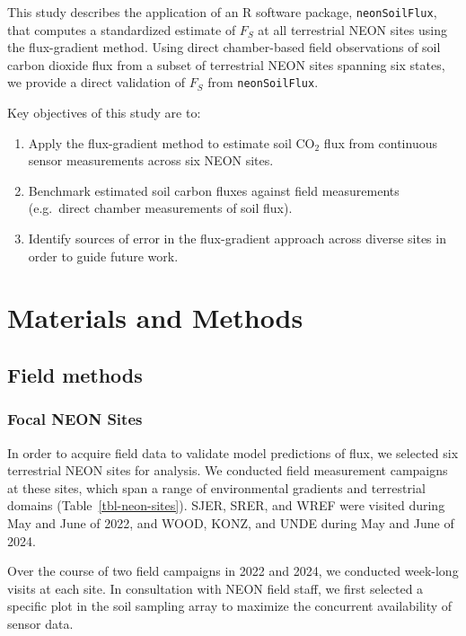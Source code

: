 \documentclass[
  letterpaper,
  DIV=11,
  numbers=noendperiod]{scrartcl}
\providecommand{\tightlist}{%
  \setlength{\itemsep}{0pt}\setlength{\parskip}{0pt}}\usepackage{longtable,booktabs,array}
\begin{document}
This study describes the application of an R software package,
\texttt{neonSoilFlux}, that computes a standardized estimate of
\(F_{S}\) at all terrestrial NEON sites using the flux-gradient method.
Using direct chamber-based field observations of soil carbon dioxide
flux from a subset of terrestrial NEON sites spanning six states, we
provide a direct validation of \(F_{S}\) from \texttt{neonSoilFlux}.

Key objectives of this study are to:

\begin{enumerate}
\def\labelenumi{\arabic{enumi}.}
\tightlist
\item
  Apply the flux-gradient method to estimate soil CO\(_{2}\) flux from
  continuous sensor measurements across six NEON sites.
\item
  Benchmark estimated soil carbon fluxes against field measurements
  (e.g.~direct chamber measurements of soil flux).
\item
  Identify sources of error in the flux-gradient approach across diverse
  sites in order to guide future work.
\end{enumerate}

\section{Materials and Methods}\label{materials-and-methods}

\subsection{Field methods}\label{field-methods}

\subsubsection{Focal NEON Sites}\label{focal-neon-sites}

In order to acquire field data to validate model predictions of flux, we
selected six terrestrial NEON sites for analysis. We conducted field
measurement campaigns at these sites, which span a range of
environmental gradients and terrestrial domains
(Table~\ref{tbl-neon-sites}). SJER, SRER, and WREF were visited during
May and June of 2022, and WOOD, KONZ, and UNDE during May and June of
2024.

Over the course of two field campaigns in 2022 and 2024, we conducted
week-long visits at each site. In consultation with NEON field staff, we
first selected a specific plot in the soil sampling array to maximize
the concurrent availability of sensor data.
\end{document}
